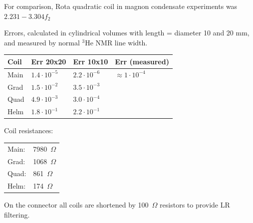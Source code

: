 \documentclass[a4paper]{article}
\begin{document}
For comparison, Rota quadratic coil in magnon condensate experiments was $2.231 - 3.304 f_2$


Errors, calculated in cylindrical volumes with length = diameter 10 and 20 mm,
and measured by normal $^3$He NMR line width.

\medskip
\begin{tabular}{llll}
Coil   & Err 20x20 & Err 10x10 & Err (measured) \\\hline
Main   & $1.4\cdot10^{-5}$ & $2.2\cdot10^{-6}$ & $\approx1\cdot10^{-4}$\\
Grad   & $1.5\cdot10^{-2}$ & $3.5\cdot10^{-3}$ & \\
Quad   & $4.9\cdot10^{-3}$ & $3.0\cdot10^{-4}$ & \\
Helm   & $1.8\cdot10^{-1}$ & $2.2\cdot10^{-1}$ & \\
\end{tabular}
\medskip

Coil resistances:

\medskip
\begin{tabular}{ll}\hline
Main: & 7980~$\Omega$\\
Grad: & 1068~$\Omega$\\
Quad: & 861~$\Omega$\\
Helm: & 174~$\Omega$\\
\end{tabular}
\medskip

On the connector all coils are shortened by 100~$\Omega$ resistors to
provide LR filtering.
\end{document}

